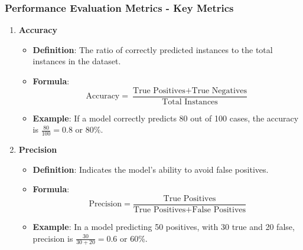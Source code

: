 \documentclass[aspectratio=169]{beamer}
\begin{document}
\begin{frame}[fragile]
    \frametitle{Performance Evaluation Metrics - Key Metrics}
    \begin{enumerate}
        \item \textbf{Accuracy}
            \begin{itemize}
                \item \textbf{Definition}: The ratio of correctly predicted instances to the total instances in the dataset.
                \item \textbf{Formula}:  
                    \[
                    \text{Accuracy} = \frac{\text{True Positives} + \text{True Negatives}}{\text{Total Instances}}
                    \]
                \item \textbf{Example}: If a model correctly predicts 80 out of 100 cases, the accuracy is \( \frac{80}{100} = 0.8 \) or 80\%.
            \end{itemize}
        \item \textbf{Precision}
            \begin{itemize}
                \item \textbf{Definition}: Indicates the model's ability to avoid false positives.
                \item \textbf{Formula}:  
                    \[
                    \text{Precision} = \frac{\text{True Positives}}{\text{True Positives} + \text{False Positives}}
                    \]
                \item \textbf{Example}: In a model predicting 50 positives, with 30 true and 20 false, precision is \( \frac{30}{30 + 20} = 0.6 \) or 60\%.
            \end{itemize}
    \end{enumerate}
\end{frame}
\end{document}
